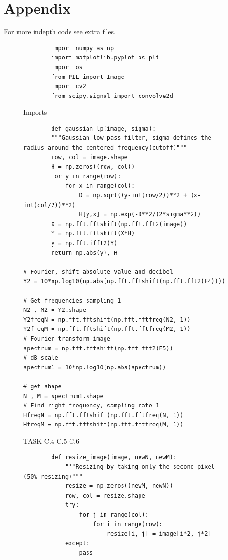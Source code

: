 {%
\newpage
\clearpage
\section{Appendix}
For more indepth code see extra files.

\begin{figure}[H]
    \begin{lstlisting}
        import numpy as np 
        import matplotlib.pyplot as plt
        import os
        from PIL import Image
        import cv2
        from scipy.signal import convolve2d
    \end{lstlisting}
\caption{Imports}
\label{Imports}
\end{figure}


\begin{figure}[H]
    \begin{lstlisting}
        def gaussian_lp(image, sigma):
        """Gaussian low pass filter, sigma defines the radius around the centered frequency(cutoff)"""
        row, col = image.shape
        H = np.zeros((row, col))
        for y in range(row):
            for x in range(col):
                D = np.sqrt((y-int(row/2))**2 + (x-int(col/2))**2)
                H[y,x] = np.exp(-D**2/(2*sigma**2))
        X = np.fft.fftshift(np.fft.fft2(image))
        Y = np.fft.fftshift(X*H)
        y = np.fft.ifft2(Y)
        return np.abs(y), H

# Fourier, shift absolute value and decibel 
Y2 = 10*np.log10(np.abs(np.fft.fftshift(np.fft.fft2(F4))))

# Get frequencies sampling 1
N2 , M2 = Y2.shape
Y2freqN = np.fft.fftshift(np.fft.fftfreq(N2, 1))
Y2freqM = np.fft.fftshift(np.fft.fftfreq(M2, 1))
# Fourier transform image
spectrum = np.fft.fftshift(np.fft.fft2(F5))
# dB scale
spectrum1 = 10*np.log10(np.abs(spectrum))

# get shape
N , M = spectrum1.shape
# Find right frequency, sampling rate 1
HfreqN = np.fft.fftshift(np.fft.fftfreq(N, 1))
HfreqM = np.fft.fftshift(np.fft.fftfreq(M, 1))
    \end{lstlisting}
\caption{TASK C.4-C.5-C.6}
\label{TASK C.4-C.5-C.6}
\end{figure}

\begin{figure}[H]
    \begin{lstlisting}
        def resize_image(image, newN, newM):
            """Resizing by taking only the second pixel (50% resizing)"""
            resize = np.zeros((newM, newN))
            row, col = resize.shape
            try:
                for j in range(col):
                    for i in range(row):
                        resize[i, j] = image[i*2, j*2]
            except:
                pass
        

\end{lstlisting}
\end{figure}}
